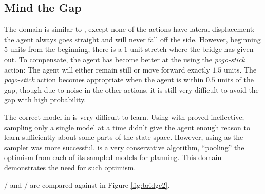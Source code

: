 \subsection{Mind the Gap}
\label{gap}

The  domain is similar to , except none of the actions have lateral displacement; the agent always goes straight and will never fall off the side. However, beginning $5$ units from the beginning, there is a $1$ unit stretch where the bridge has given out. To compensate, the agent has become better at the using the \emph{pogo-stick} action: The agent will either remain still or move forward exactly $1.5$ units. The \emph{pogo-stick} action becomes appropriate when the agent is within $0.5$ units of the gap, though due to noise in the other actions, it is still very difficult to avoid the gap with high probability.

The correct model in  is very difficult to learn. Using  with  proved ineffective; sampling only a single model at a time didn't give the agent enough reason to learn sufficiently about some parts of the state space. However, using  as the sampler was more successful.  is a very conservative algorithm, ``pooling'' the optimism from each of its sampled models for planning. This domain demonstrates the need for such optimism.

/ and / are compared against  in Figure \ref{fig:bridge2}.

